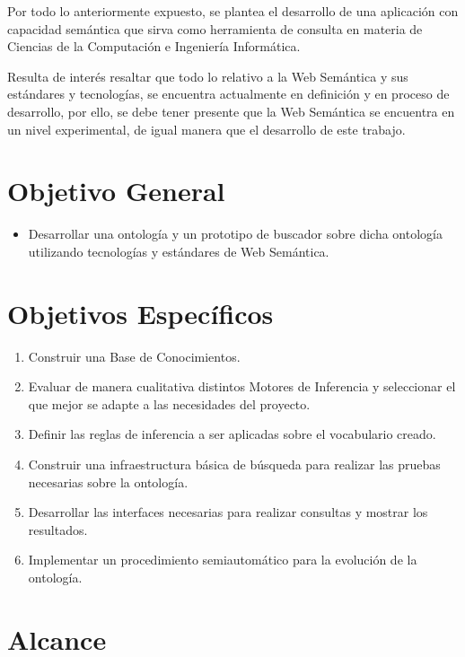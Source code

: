 Por todo lo anteriormente expuesto, se plantea el desarrollo de una aplicación con capacidad semántica que sirva como herramienta de consulta en materia de Ciencias de la Computación e Ingeniería Informática.

Resulta de interés resaltar que todo lo relativo a la Web Semántica y sus estándares y tecnologías, se encuentra actualmente en definición y en proceso de desarrollo, por ello, se debe tener presente que la Web Semántica se encuentra en un nivel experimental, de igual manera que el desarrollo de este trabajo.

\newpage


\section{Objetivo General}

\begin{itemize}
\item Desarrollar una ontología y un prototipo de buscador sobre dicha ontología utilizando tecnologías y estándares de Web Semántica.
\end{itemize}

\section{Objetivos Específicos }

\begin{enumerate}
    \item Construir una Base de Conocimientos.
    \item Evaluar de manera cualitativa distintos Motores de Inferencia y seleccionar el que mejor se adapte a las necesidades del proyecto.
    \item Definir las reglas de inferencia a ser aplicadas sobre el vocabulario creado.
    \item Construir una infraestructura básica de búsqueda para realizar las pruebas necesarias sobre la ontología.
    \item Desarrollar las interfaces necesarias para realizar consultas y mostrar los resultados.
    \item Implementar un procedimiento semiautomático para la evolución de la ontología.
\end{enumerate}


\section{Alcance }

